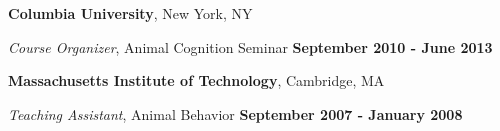 \documentclass[margin,line]{res}
\newenvironment{list2}{
  \begin{list}{$\bullet$}{%
      \setlength{\itemsep}{0in}
      \setlength{\parsep}{0in} \setlength{\parskip}{0in}
      \setlength{\topsep}{0in} \setlength{\partopsep}{0in} 
      \setlength{\leftmargin}{0.2in}}}{\end{list}}
\begin{document}
\begin{resume}

{\bf Columbia University}, New York, NY

\vspace{-.2cm}
{\em Course Organizer}, Animal Cognition Seminar \hfill {\bf September 2010 - June 2013}\\
\vspace{-.5cm}


{\bf Massachusetts Institute of Technology}, Cambridge, MA

\vspace{-.2cm}
{\em Teaching Assistant}, Animal Behavior \hfill {\bf September 2007 - January 2008}\\
\vspace{-.5cm}




\vspace{.5cm}

%






\end{resume}
\end{document}
